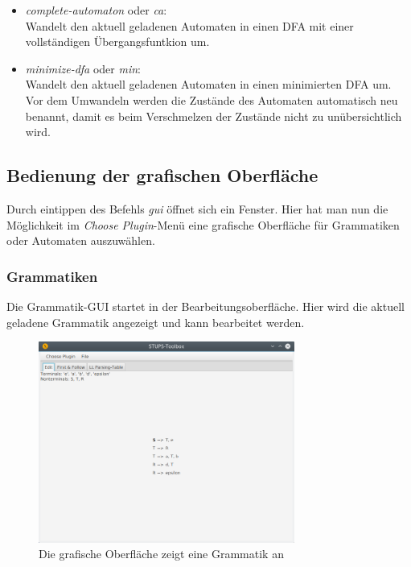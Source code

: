 \begin{itemize}
\begin{itemize}
		\item \textit{complete-automaton} oder \textit{ca}:\\
		Wandelt den aktuell geladenen Automaten in einen DFA mit einer vollständigen Übergangsfuntkion um.
		\item \textit{minimize-dfa} oder \textit{min}:\\
		Wandelt den aktuell geladenen Automaten in einen minimierten DFA um. Vor dem Umwandeln werden die Zustände des Automaten automatisch neu benannt, damit es beim Verschmelzen der Zustände nicht zu unübersichtlich wird.
	\end{itemize}
\end{itemize}
\subsection{Bedienung der grafischen Oberfläche}
\label{sec:2.4}
Durch eintippen des Befehls \textit{gui} öffnet sich ein Fenster. Hier hat man nun die Möglichkeit im \textit{Choose Plugin}-Menü eine grafische Oberfläche für Grammatiken oder Automaten auszuwählen.
\subsubsection{Grammatiken}
\label{sec:2.4.1}
Die Grammatik-GUI startet in der Bearbeitungsoberfläche. Hier wird die aktuell geladene Grammatik angezeigt und kann bearbeitet werden.
\begin{figure}[H]
	\centering
	\includegraphics[width=0.75\textwidth]{bilder/gui1.png}
	\caption{Die grafische Oberfläche zeigt eine Grammatik an}
	\label{fig:pic4}
\end{figure}
